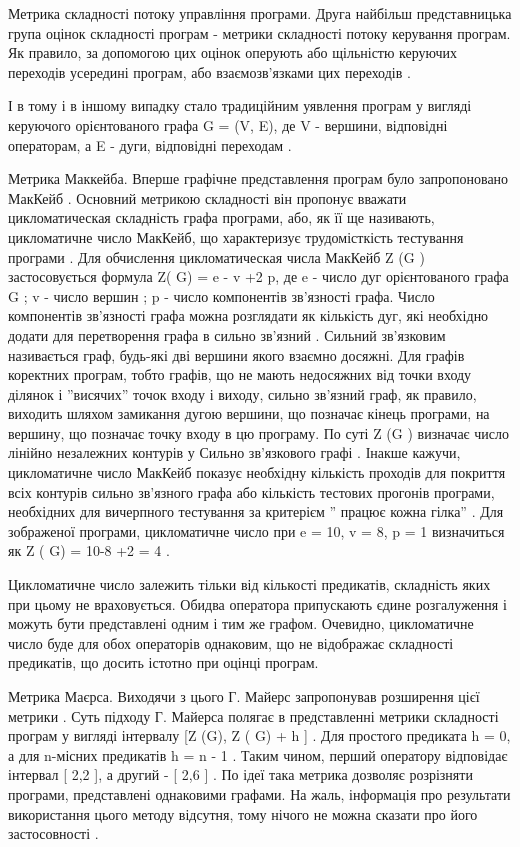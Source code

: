 Метрика складності потоку управління програми.
Друга найбільш представницька група оцінок складності програм - метрики складності потоку керування програм. Як правило, за допомогою цих оцінок оперують або щільністю керуючих переходів усередині програм, або взаємозв'язками цих переходів .

І в тому і в іншому випадку стало традиційним уявлення програм у вигляді керуючого орієнтованого графа G = (V, E), де V - вершини, відповідні операторам, а E - дуги, відповідні переходам .

Метрика Маккейба.
Вперше графічне представлення програм було запропоновано МакКейб . Основний метрикою складності він пропонує вважати цикломатическая складність графа програми, або, як її ще називають, цикломатичне число МакКейб, що характеризує трудомісткість тестування програми .
Для обчислення цикломатическая числа МакКейб Z (G ) застосовується формула
Z( G) = e - v +2 p,
де e - число дуг орієнтованого графа G ;
v - число вершин ;
p - число компонентів зв'язності графа.
Число компонентів зв'язності графа можна розглядати як кількість дуг, які необхідно додати для перетворення графа в сильно зв'язний . Сильний зв'язковим називається граф, будь-які дві вершини якого взаємно досяжні. Для графів коректних програм, тобто графів, що не мають недосяжних від точки входу ділянок і ''висячих'' точок входу і виходу, сильно зв'язний граф, як правило, виходить шляхом замикання дугою вершини, що позначає кінець програми, на вершину, що позначає точку входу в цю програму.
По суті Z (G ) визначає число лінійно незалежних контурів у Сильно зв'язкового графі . Інакше кажучи, цикломатичне число МакКейб показує необхідну кількість проходів для покриття всіх контурів сильно зв'язного графа або кількість тестових прогонів програми, необхідних для вичерпного тестування за критерієм '' працює кожна гілка'' .
Для зображеної програми, цикломатичне число при e = 10, v = 8, p = 1 визначиться як Z ( G) = 10-8 +2 = 4 .

Цикломатичне число залежить тільки від кількості предикатів, складність яких при цьому не враховується. 
Обидва оператора припускають єдине розгалуження і можуть бути представлені одним і тим же графом. Очевидно, цикломатичне число буде для обох операторів однаковим, що не відображає складності предикатів, що досить істотно при оцінці програм.

Метрика Маєрса.
Виходячи з цього Г. Майерс запропонував розширення цієї метрики . Суть підходу Г. Майерса полягає в представленні метрики складності програм у вигляді інтервалу {[}Z (G), Z ( G) + h {]} . Для простого предиката h = 0, а для n-місних предикатів h = n - 1 . Таким чином, перший оператору відповідає інтервал {[} 2,2 {]}, а другий - {[} 2,6 {]} .
По ідеї така метрика дозволяє розрізняти програми, представлені однаковими графами. На жаль, інформація про результати використання цього методу відсутня, тому нічого не можна сказати про його застосовності .

